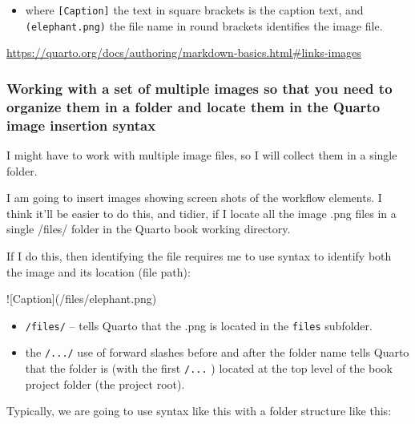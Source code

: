 \documentclass[
  letterpaper,
  DIV=11,
  numbers=noendperiod]{scrreprt}
\newenvironment{Shaded}{\begin{snugshade}}{\end{snugshade}}
\newcommand{\NormalTok}[1]{\textcolor[rgb]{0.00,0.23,0.31}{#1}}
\newcommand{\SpecialCharTok}[1]{\textcolor[rgb]{0.37,0.37,0.37}{#1}}
\providecommand{\tightlist}{%
  \setlength{\itemsep}{0pt}\setlength{\parskip}{0pt}}
\begin{document}
\begin{itemize}
\tightlist
\item
  where \texttt{{[}Caption{]}} the text in square brackets is the
  caption text, and \texttt{(elephant.png)} the file name in round
  brackets identifies the image file.
\end{itemize}

\url{https://quarto.org/docs/authoring/markdown-basics.html\#links-images}

\subsubsection{Working with a set of multiple images so that you need to
organize them in a folder and locate them in the Quarto image insertion
syntax}\label{working-with-a-set-of-multiple-images-so-that-you-need-to-organize-them-in-a-folder-and-locate-them-in-the-quarto-image-insertion-syntax}

I might have to work with multiple image files, so I will collect them
in a single folder.

I am going to insert images showing screen shots of the workflow
elements. I think it'll be easier to do this, and tidier, if I locate
all the image .png files in a single /files/ folder in the Quarto book
working directory.

If I do this, then identifying the file requires me to use syntax to
identify both the image and its location (file path):

\begin{Shaded}
\begin{Highlighting}[]
\SpecialCharTok{!}\NormalTok{[Caption](}\SpecialCharTok{/}\NormalTok{files}\SpecialCharTok{/}\NormalTok{elephant.png)}
\end{Highlighting}
\end{Shaded}

\begin{itemize}
\tightlist
\item
  \texttt{/files/} -- tells Quarto that the .png is located in the
  \texttt{files} subfolder.
\item
  the \texttt{/.../} use of forward slashes before and after the folder
  name tells Quarto that the folder is (with the first \texttt{/...} )
  located at the top level of the book project folder (the project
  root).
\end{itemize}

Typically, we are going to use syntax like this with a folder structure
like this:
\end{document}
